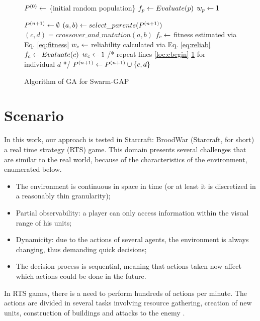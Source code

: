 \documentclass[conference]{IEEEtran}
\begin{document}
\begin{figure}[ht]
\begin{algorithmic}[1]
\STATE $P^{(0)} \gets$ \{initial random population\}
\STATE $f_{p} \gets Evaluate(p)$
\STATE $w_{p} \gets 1$
\ENDFOR

\STATE $P^{(n+1)} \gets \emptyset$
\STATE $(a,b) \gets select\_parents(P^{(n+1)})$
\STATE $(c,d) = crossover\_and\_mutation(a,b)$
\STATE $f_{c} \gets $ fitness estimated via Eq. \ref{eq:fitness} \label{loc:cbegin}
\STATE $w_{c} \gets $ reliability calculated via Eq. \ref{eq:reliab}
\STATE $f_{c} \gets Evaluate(c)$
\STATE $w_{c} \gets 1$ \label{loc:cend}
\ENDIF
\STATE /* repeat lines \ref{loc:cbegin}-\ref{loc:cend} for individual $d$ */
\STATE $P^{(n+1)} \gets P^{(n+1)} \cup \{c,d\}$
\ENDWHILE
\ENDFOR
\end{algorithmic}
\caption{Algorithm of GA for Swarm-GAP}
\end{figure}

\section{Scenario}
\label{sec:scenario}

In this work, our approach is tested in Starcraft: BroodWar (Starcraft, for short) a real time strategy (RTS) game. This domain presents several challenges that are similar to the real world, because of the characteristics of the environment, enumerated below.

\begin{itemize}
	\item The environment is continuous in space in time (or at least it is discretized in a reasonably thin granularity);
	\item Partial observability: a player can only access information within the visual range of his units;
	\item Dynamicity: due to the actions of several agents, the environment is always changing, thus demanding quick decisions;
	\item The decision process is sequential, meaning that actions taken now affect which actions could be done in the future.
\end{itemize}

In RTS games, there is a need to perform hundreds of actions per minute. The actions are divided in several tasks involving resource gathering, creation of new units, construction of buildings and attacks to the enemy \cite{Weber+2011}.
\end{document}
